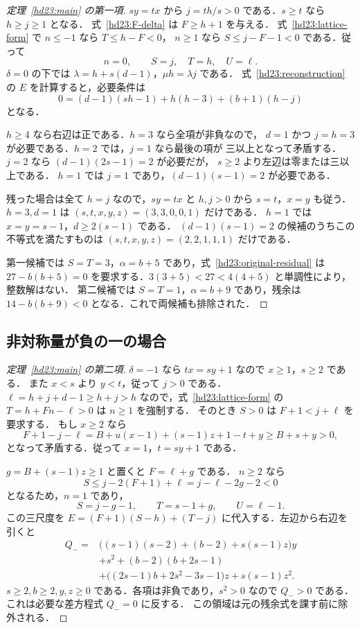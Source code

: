\begin{proof}[定理~\ref{hd23:main} の第一項]
$sy=tx$ から $j=th/s>0$ である．$s\ge t$ なら $h\ge j\ge1$ となる．
式~\eqref{hd23:F-delta} は $F\ge h+1$ を与える．
式~\eqref{hd23:lattice-form} で $n\le-1$ なら $T\le h-F<0$，
$n\ge1$ なら $S\le j-F-1<0$ である．従って
\[
 n=0,\qquad S=j,\quad T=h,\quad U=\ell.
\]
$\delta=0$ の下では $\lambda=h+s(d-1)$，$\mu h=\lambda j$ である．
式~\eqref{hd23:reconstruction} の $E$ を計算すると，必要条件は
\begin{equation}\label{hd23:delta-zero-equation}
 0=(d-1)(sh-1)+h(h-3)+(b+1)(h-j)
\end{equation}
となる．

$h\ge4$ なら右辺は正である．$h=3$ なら全項が非負なので，
$d=1$ かつ $j=h=3$ が必要である．$h=2$ では，$j=1$ なら最後の項が
三以上となって矛盾する．$j=2$ なら $(d-1)(2s-1)=2$ が必要だが，
$s\ge2$ より左辺は零または三以上である．
$h=1$ では $j=1$ であり，$(d-1)(s-1)=2$ が必要である．

残った場合は全て $h=j$ なので，$sy=tx$ と $h,j>0$ から $s=t$，$x=y$ も従う．
$h=3,d=1$ は $(s,t,x,y,z)=(3,3,0,0,1)$ だけである．
$h=1$ では $x=y=s-1$，$d\ge2(s-1)$ である．
$(d-1)(s-1)=2$ の候補のうちこの不等式を満たすものは
$(s,t,x,y,z)=(2,2,1,1,1)$ だけである．

第一候補では $S=T=3$，$\alpha=b+5$ であり，式~\eqref{hd23:original-residual} は
$27-b(b+5)=0$ を要求する．$3(3+5)<27<4(4+5)$ と単調性により，整数解はない．
第二候補では $S=T=1$，$\alpha=b+9$ であり，残余は
$14-b(b+9)<0$ となる．これで両候補も排除された．
\end{proof}

\subsection{非対称量が負の一の場合}

\begin{proof}[定理~\ref{hd23:main} の第二項]
$\delta=-1$ なら $tx=sy+1$ なので $x\ge1$，$s\ge2$ である．
また $x<s$ より $y<t$，従って $j>0$ である．
$\ell=h+j+d-1\ge h+j>h$ なので，式~\eqref{hd23:lattice-form} の
$T=h+Fn-\ell>0$ は $n\ge1$ を強制する．
そのとき $S>0$ は $F+1<j+\ell$ を要求する．
もし $x\ge2$ なら
\[
 F+1-j-\ell
 =B+u(x-1)+(s-1)z+1-t+y
 \ge B+s+y>0,
\]
となって矛盾する．従って $x=1$，$t=sy+1$ である．

$g=B+(s-1)z\ge1$ と置くと $F=\ell+g$ である．
$n\ge2$ なら
\[
 S\le j-2(F+1)+\ell=j-\ell-2g-2<0
\]
となるため，$n=1$ であり，
\[
 S=j-g-1,\qquad T=s-1+g,\qquad U=\ell-1.
\]
この三尺度を $E=(F+1)(S-h)+(T-j)$ に代入する．左辺から右辺を引くと
\begin{equation}\label{hd23:delta-minus-positive}
 \begin{aligned}
 Q_-={}&\bigl((s-1)(s-2)+(b-2)+s(s-1)z\bigr)y\\
 &+s^2+(b-2)(b+2s-1)\\
 &+\bigl((2s-1)b+2s^2-3s-1\bigr)z+s(s-1)z^2.
 \end{aligned}
\end{equation}
$s\ge2,b\ge2,y,z\ge0$ である．各項は非負であり，$s^2>0$ なので
$Q_->0$ である．これは必要な差方程式 $Q_-=0$ に反する．
この領域は元の残余式を課す前に除外される．
\end{proof}

